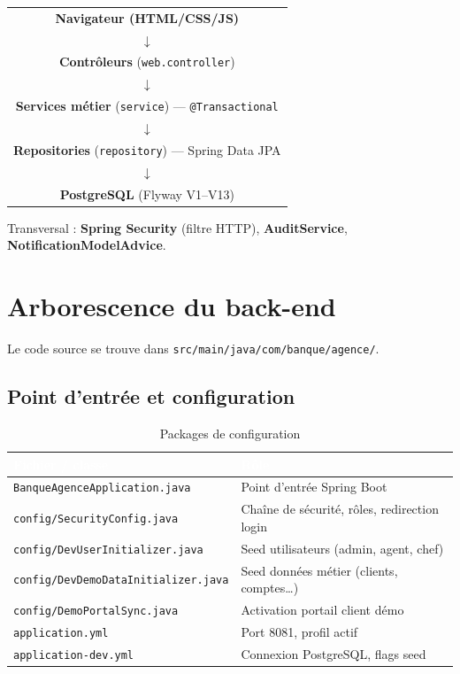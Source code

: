 \documentclass[11pt,a4paper,oneside]{report}
\newcommand{\tabhead}[1]{\textcolor{white}{\textbf{#1}}}
\begin{document}
\begin{center}
\begin{tabular}{c}
    \textbf{Navigateur (HTML/CSS/JS)} \\
    $\downarrow$ \\
    \textbf{Contrôleurs} (\texttt{web.controller}) \\
    $\downarrow$ \\
    \textbf{Services métier} (\texttt{service}) — \texttt{@Transactional} \\
    $\downarrow$ \\
    \textbf{Repositories} (\texttt{repository}) — Spring Data JPA \\
    $\downarrow$ \\
    \textbf{PostgreSQL} (Flyway V1--V13) \\
\end{tabular}
\end{center}

Transversal : \textbf{Spring Security} (filtre HTTP), \textbf{AuditService}, \textbf{NotificationModelAdvice}.

\section{Arborescence du back-end}

Le code source se trouve dans \texttt{src/main/java/com/banque/agence/}.

\subsection{Point d'entrée et configuration}

\begin{table}[H]
    \centering
    \caption{Packages de configuration}
    \label{tab:config}
    \small
    \begin{tabular}{@{}lp{9cm}@{}}
        \rowcolor{AmanaBrown}
        \tabhead{Fichier / classe} & \tabhead{Rôle} \\
        \midrule
        \texttt{BanqueAgenceApplication.java} & Point d'entrée Spring Boot \\
        \texttt{config/SecurityConfig.java} & Chaîne de sécurité, rôles, redirection login \\
        \texttt{config/DevUserInitializer.java} & Seed utilisateurs (admin, agent, chef) \\
        \texttt{config/DevDemoDataInitializer.java} & Seed données métier (clients, comptes…) \\
        \texttt{config/DemoPortalSync.java} & Activation portail client démo \\
        \texttt{application.yml} & Port 8081, profil actif \\
        \texttt{application-dev.yml} & Connexion PostgreSQL, flags seed \\
        \bottomrule
    \end{tabular}
\end{table}
\end{document}
